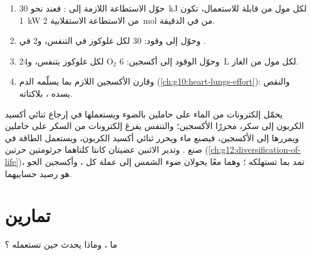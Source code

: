 \begin{method}\label{met:g12:respiration-fermentation:budget}
\begin{enumerate}
  \item حوّل الاستطاعة اللازمة إلى : فعند نحو \qty{30}{kJ} لكل مول
        من  قابلة للاستعمال، تكون \qty{1}{kW} من الاستطاعة
        الاستقلابية \qty{2}{mol} من  في الدقيقة.
  \item وحوّل  إلى وقود: 30  لكل غلوكوز في التنفس، و2 في .
  \item وحوّل الوقود إلى أكسجين: 6 $\mathrm{O_2}$ لكل غلوكوز يتنفس،
        و\qty{24}{L} لكل مول من الغاز.
  \item وقارن الأكسجين اللازم بما يسلّمه الدم
        (\cref{ch:g10:heart-lungs-effort}): والنقص يسده ،
        بلاكتاته.
\end{enumerate}
\end{method}

\begin{remark}\label{rem:g12:respiration-fermentation:mirror}
 يحمّل إلكترونات من الماء على حاملين بالضوء ويستعملها في
إرجاع ثنائي أكسيد الكربون إلى سكر، محررًا الأكسجين؛ والتنفس يفرغ
إلكترونات من السكر على حاملين ويمررها إلى الأكسجين، فيصنع ماء ويحرر
ثنائي أكسيد الكربون، ويستعمل الطاقة في صنع . وتدير الاثنين عضيتان
كانتا كلتاهما جرثومتين حرتين (\cref{ch:g12:diversification-of-life})،
 تمد بما تستهلكه ؛ وهما معًا يحولان ضوء
الشمس إلى عملة كل ، وأكسجين الجو هو رصيد حسابيهما.
\end{remark}

\section{تمارين}

\begin{exercise}[$\star$]\label{exo:g12:respiration-fermentation:1}
ما ، وماذا يحدث حين تستعمله ؟
\end{exercise}

